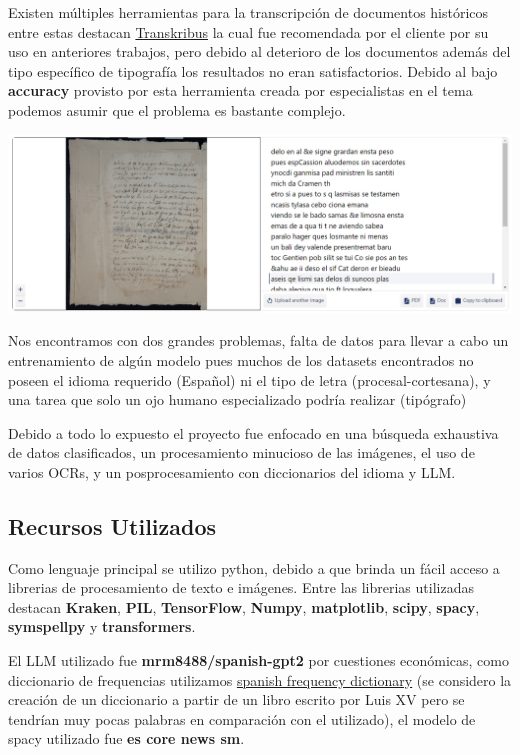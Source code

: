 \documentclass[11pt,a4paper]{article}
\begin{document}
Existen m\'ultiples herramientas para la transcripción de documentos hist\'oricos entre estas destacan \href{https://www.transkribus.org/}{Transkribus} la cual fue recomendada por el cliente por su uso en anteriores trabajos, pero debido al deterioro de los documentos adem\'as del tipo espec\'ifico de tipograf\'ia los resultados no eran satisfactorios. Debido al bajo \textbf{accuracy} provisto por esta herramienta creada por especialistas en el tema podemos asumir que el problema es bastante complejo.

\begin{center} \includegraphics[width=1.0\textwidth]{transkribus} \end{center}

Nos encontramos con dos grandes problemas, falta de datos para llevar a cabo un entrenamiento de alg\'un modelo pues muchos de los datasets encontrados no poseen el idioma requerido (Español) ni el tipo de letra (procesal-cortesana), y una tarea que solo un ojo humano especializado podr\'ia realizar (tip\'ografo)

Debido a todo lo expuesto el proyecto fue enfocado en una b\'usqueda exhaustiva de datos clasificados, un procesamiento minucioso de las im\'agenes, el uso de varios OCRs, y un posprocesamiento con diccionarios del idioma y LLM.

\subsection{Recursos Utilizados}

Como lenguaje principal se utilizo python, debido a que brinda un f\'acil acceso a librerias de procesamiento de texto e im\'agenes. Entre las librerias utilizadas destacan \textbf{Kraken}, \textbf{PIL}, \textbf{TensorFlow}, \textbf{Numpy},  \textbf{matplotlib}, \textbf{scipy}, \textbf{spacy}, \textbf{symspellpy} y \textbf{transformers}.

El LLM utilizado fue \textbf{mrm8488/spanish-gpt2} por cuestiones económicas, como diccionario de frequencias utilizamos \href{https://github.com/hermitdave/FrequencyWords/blob/master/content/2016/es/es_full.txt}{spanish frequency dictionary} (se considero la creaci\'on de un diccionario a partir de un libro escrito por Luis XV pero se tendr\'ian muy pocas palabras en comparaci\'on con el utilizado), el modelo de spacy utilizado fue \textbf{es core news sm}.
\end{document}
